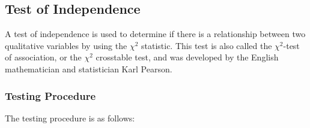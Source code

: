 \subsection{Test of Independence}
\label{ssec:test-of-independence}

A test of independence is used to determine if there is a relationship between two qualitative variables by using the $\chi^2$ statistic. This test is also called the $\chi^2$-test of association, or the $\chi^2$ crosstable test, and was developed by the English mathematician and statistician Karl Pearson.

\subsubsection{Testing Procedure}

The testing procedure is as follows:

